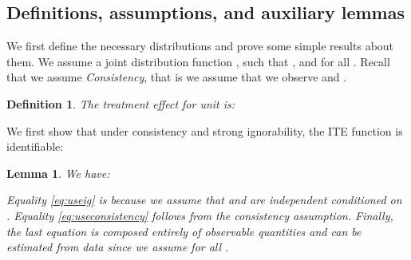 \documentclass{article}
\newtheorem{thmappdef}{Definition}
\newtheorem{thmapplem}{Lemma}
\begin{document}
\subsection{Definitions, assumptions, and auxiliary lemmas}
\begin{figure*}
\begin{minipage}{\textwidth}\noindent{}
\end{minipage}
\end{figure*}


We first define the necessary distributions and prove some simple results about them. We assume a joint distribution function , such that , and  for all . 
Recall that we assume \emph{Consistency}, that is we assume that we observe  and .

\begin{thmappdef}\label{def:teA}
The treatment effect for unit  is:

\end{thmappdef}

We first show that under consistency and strong ignorability, the ITE function  is identifiable:
\begin{thmapplem}
We have:

Equality \eqref{eq:useig} is because we assume that  and  are independent conditioned on .
Equality \eqref{eq:useconsistency} follows from the consistency assumption.
Finally, the last equation is composed entirely of observable quantities and can be estimated from data since we assume  for all .
\end{thmapplem}
\end{document}
